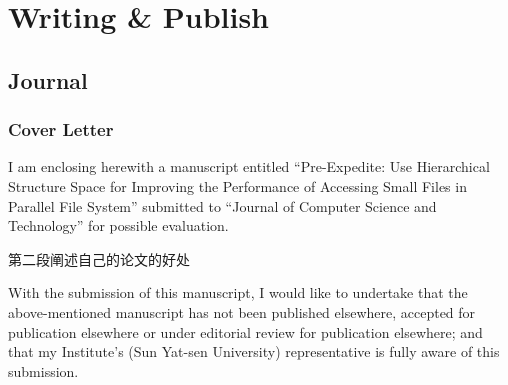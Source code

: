 \documentclass[UTF8]{article}
\begin{document}
\section{Writing \& Publish}
\subsection{Journal}
\subsubsection{Cover Letter}
I am enclosing herewith a manuscript entitled “Pre-Expedite: Use Hierarchical Structure Space for Improving the Performance of Accessing Small Files in Parallel File System” submitted to “Journal of Computer Science and Technology” for possible evaluation. 

第二段阐述自己的论文的好处

With the submission of this manuscript, I would like to undertake that the above-mentioned manuscript has not been published elsewhere, accepted for publication elsewhere or under editorial review for publication elsewhere; and that my Institute’s (Sun Yat-sen University) representative is fully aware of this submission.



\end{document}
